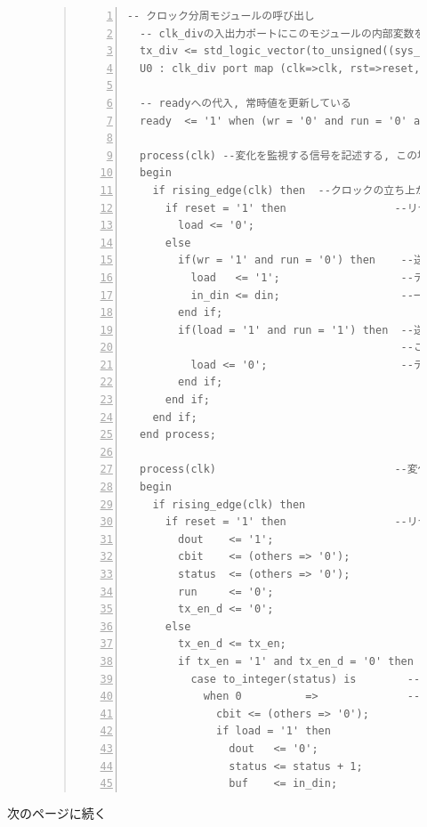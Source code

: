 \documentclass[a4paper,dvipdfmx]{jsarticle}
\begin{document}
\begin{figure}[H]
\begin{quote}
\begin{Verbatim}[frame=single, numbers=left, baselinestretch=0.8]
  -- クロック分周モジュールの呼び出し
  -- clk_divの入出力ポートにこのモジュールの内部変数を接続
  tx_div <= std_logic_vector(to_unsigned((sys_clk / rate) - 1, 16));
  U0 : clk_div port map (clk=>clk, rst=>reset, div=>tx_div, clk_out=>tx_en);

  -- readyへの代入, 常時値を更新している
  ready  <= '1' when (wr = '0' and run = '0' and load = '0') else '0';

  process(clk) --変化を監視する信号を記述する, この場合クロック
  begin
    if rising_edge(clk) then  --クロックの立ち上がり時の動作
      if reset = '1' then                 --リセット時の動作, 初期値の設定
        load <= '0';
      else
        if(wr = '1' and run = '0') then    --送信要求があり，かつ送信中でない場合
          load   <= '1';                   --データを取り込んだフラグを立てる
          in_din <= din;                   --一時保存用レジスタに値を格納
        end if;
        if(load = '1' and run = '1') then  --送信中で，かつデータを取り込んだ
                                           --ことを示すフラグが立っている場合
          load <= '0';                     --データを取り込んだフラグを下げる
        end if;
      end if;
    end if;
  end process;

  process(clk)                            --変化を監視する信号(クロック)
  begin
    if rising_edge(clk) then
      if reset = '1' then                 --リセット時の動作, 初期値の設定
        dout    <= '1';
        cbit    <= (others => '0');
        status  <= (others => '0');
        run     <= '0';
        tx_en_d <= '0';
      else
        tx_en_d <= tx_en;
        if tx_en = '1' and tx_en_d = '0' then -- tx_enの立ち上がりで動作
          case to_integer(status) is        --statusの値に応じて動作が異なる
            when 0          =>              --初期状態
              cbit <= (others => '0');        --カウンタをクリア
              if load = '1' then              -- データを取り込んでいる場合
                dout   <= '0';                -- スタートビット0を出力
                status <= status + 1;         -- 次の状態へ
                buf    <= in_din;             -- 送信データを一時バッファに退避
\end{Verbatim}
\end{quote}
\end{figure}
次のページに続く
\end{document}
